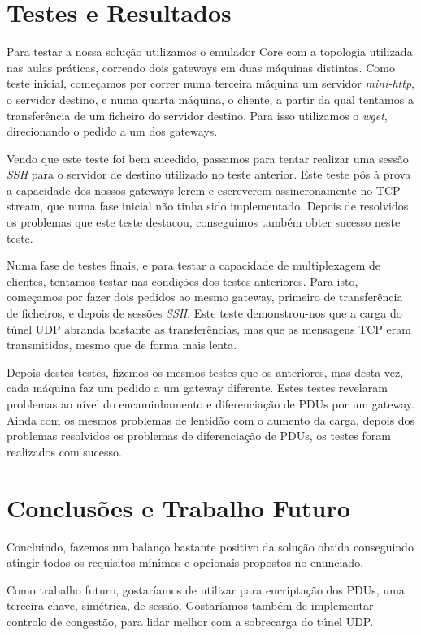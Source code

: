 \documentclass[a4paper]{report}
\begin{document}
\chapter{Testes e Resultados}

Para testar a nossa solução utilizamos o emulador Core com a topologia utilizada
nas aulas práticas, correndo dois gateways em duas máquinas distintas. Como
teste inicial, começamos por correr numa terceira máquina um servidor 
\textit{mini-http}, o servidor destino, e numa quarta máquina, o cliente,
a partir da qual tentamos a transferência de um ficheiro do servidor destino.
Para isso utilizamos o \textit{wget}, direcionando o pedido a um dos gateways.

Vendo que este teste foi bem sucedido, passamos para tentar realizar uma
sessão \textit{SSH} para o servidor de destino utilizado no teste anterior.
Este teste pôs à prova a capacidade dos nossos gateways lerem e escreverem
assincronamente no TCP stream, que numa fase inicial não tinha sido
implementado. Depois de resolvidos os problemas que este teste destacou,
conseguimos também obter sucesso neste teste.

Numa fase de testes finais, e para testar a capacidade de multiplexagem de
clientes, tentamos testar nas condições dos testes anteriores. Para isto,
começamos por fazer dois pedidos ao mesmo gateway, primeiro de transferência de
ficheiros, e depois de sessões \textit{SSH}. Este teste demonstrou-nos que
a carga do túnel UDP abranda bastante as transferências, mas que as mensagens
TCP eram transmitidas, mesmo que de forma mais lenta. 

Depois destes testes, fizemos os mesmos testes que os anteriores, mas desta
vez, cada máquina faz um pedido a um gateway diferente. Estes testes revelaram
problemas ao nível do encaminhamento e diferenciação de PDUs por um gateway.
Ainda com os mesmos problemas de lentidão com o aumento da carga, depois
dos problemas resolvidos os problemas de diferenciação de PDUs, os testes
foram realizados com sucesso.

\chapter{Conclusões e Trabalho Futuro}

Concluindo, fazemos um balanço bastante positivo da solução obtida conseguindo
atingir todos os requisitos mínimos e opcionais propostos no enunciado.

Como trabalho futuro, gostaríamos de utilizar para encriptação dos PDUs,
uma terceira chave, simétrica, de sessão. Gostaríamos também de implementar
controlo de congestão, para lidar melhor com a sobrecarga do túnel UDP. 
\end{document}
